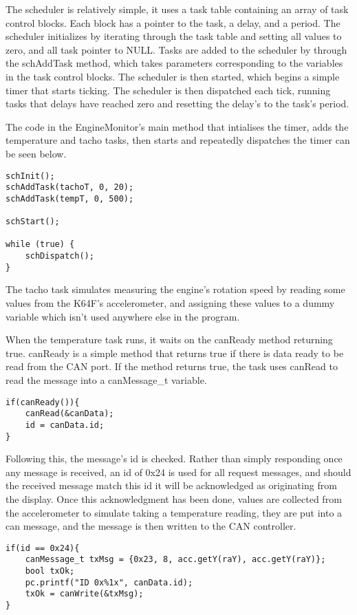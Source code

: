 \documentclass[]{report}
\begin{document}
			The scheduler is relatively simple, it uses a task table containing an array of task control blocks. Each block has a pointer to the task, a delay, and a period. The scheduler initializes by iterating through the task table and setting all values to zero, and all task pointer to NULL. Tasks are added to the scheduler by through the schAddTask method, which takes parameters corresponding to the variables in the task control blocks. The scheduler is then started, which begins a simple timer that starts ticking. The scheduler is then dispatched each tick, running tasks that delays have reached zero and resetting the delay's to the task's period. 
			
			The code in the EngineMonitor's main method that intialises the timer, adds the temperature and tacho tasks, then starts and repeatedly dispatches the timer can be seen below.
			
\begin{lstlisting}
schInit();
schAddTask(tachoT, 0, 20);
schAddTask(tempT, 0, 500);
			
schStart();

while (true) {
	schDispatch();
}
\end{lstlisting}

			The tacho task simulates measuring the engine's rotation speed by reading some values from the K64F's accelerometer, and assigning these values to a dummy variable which isn't used anywhere else in the program.
			
			When the temperature task runs, it waits on the canReady method returning true. canReady is a simple method that returns true if there is data ready to be read from the CAN port. If the method returns true, the task uses canRead to read the message into a canMessage\_t variable.
\begin{lstlisting}
if(canReady()){
	canRead(&canData);
	id = canData.id;
}
\end{lstlisting}

			Following this, the message's id is checked. Rather than simply responding once any message is received, an id of 0x24 is used for all request messages, and should the received message match this id it will be acknowledged as originating from the display. Once this acknowledgment has been done, values are collected from the accelerometer to simulate taking a temperature reading, they are put into a can message, and the message is then written to the CAN controller.	
\begin{lstlisting}
if(id == 0x24){
	canMessage_t txMsg = {0x23, 8, acc.getY(raY), acc.getY(raY)};
	bool txOk;
	pc.printf("ID 0x%1x", canData.id);
	txOk = canWrite(&txMsg);
}
\end{lstlisting} 
\end{document}
